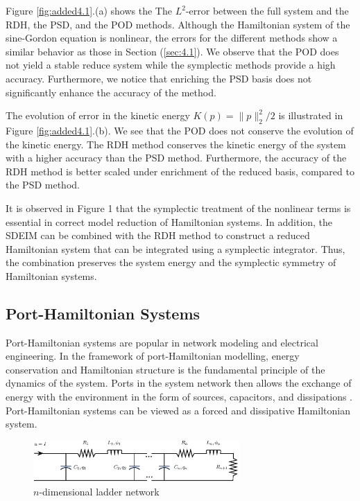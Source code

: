 Figure \ref{fig:added4.1}.(a) shows the The $L^2$-error between the full system and the RDH, the PSD, and the POD methods. Although the Hamiltonian system of the sine-Gordon equation is nonlinear, the errors for the different methods show a similar behavior as those in Section (\ref{sec:4.1}). We observe that the POD does not yield a stable reduce system while the symplectic methods provide a high accuracy. Furthermore, we notice that enriching the PSD basis does not significantly enhance the accuracy of the method.

The evolution of error in the kinetic energy $K(p) = \|p\|_2^2/2$ is illustrated in Figure \ref{fig:added4.1}.(b). We see that the POD does not conserve the evolution of the kinetic energy. The RDH method conserves the kinetic energy of the system with a higher accuracy than the PSD method. Furthermore, the accuracy of the RDH method is better scaled under enrichment of the reduced basis, compared to the PSD method. 

It is observed in Figure 1 that the symplectic treatment of the nonlinear terms is essential in correct model reduction of Hamiltonian systems. In addition, the SDEIM can be combined with the RDH method to construct a reduced Hamiltonian system that can be integrated using a symplectic integrator. Thus, the combination preserves the system energy and the symplectic symmetry of Hamiltonian systems.

\subsection{Port-Hamiltonian Systems}
Port-Hamiltonian systems are popular in network modeling and electrical engineering. In the framework of port-Hamiltonian modelling, energy conservation and Hamiltonian structure is the fundamental principle of the dynamics of the system. Ports in the system network then allows the exchange of energy with the environment in the form of sources, capacitors, and dissipations \cite{vanderSchaft:2014:PST:2693645.2693646}. Port-Hamiltonian systems can be viewed as a forced and dissipative Hamiltonian system.
\begin{figure}[t]
\begin{center}
	\includegraphics[width=0.7\textwidth]{./figs/porthamil/circuit}
\end{center}
\caption{$n$-dimensional ladder network} \label{fig:4.2}
\end{figure}

